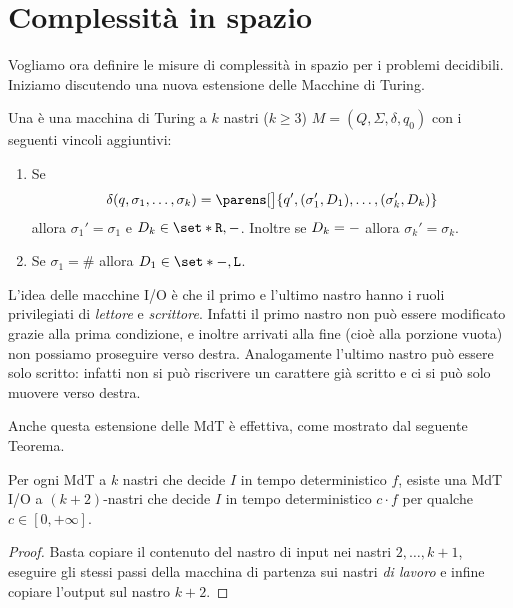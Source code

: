 \section{Complessità in spazio}

Vogliamo ora definire le misure di complessità in spazio per i problemi decidibili.
Iniziamo discutendo una nuova estensione delle Macchine di Turing.

\begin{definition}
    Una  è una macchina di Turing a $k$ nastri ($k \geq 3$)
    $M = (Q, \Sigma, \delta, q_0)$ con i seguenti vincoli aggiuntivi: \begin{enumerate}[(1)]
        \item Se \[
            \delta(q, \sigma_1, \dots, \sigma_k) = 
            \parens[\big]{q', (\sigma_1', D_1), \dots, (\sigma_k', D_k)}
        \] allora $\sigma_1' = \sigma_1$ e $D_k \in \set*{\Right, \blank}$. 
        Inoltre se $D_k = {-}$ allora $\sigma_k' = \sigma_k$.
        \item Se $\sigma_1 = \#$ allora $D_1 \in \set*{\blank, \Left}$.      
    \end{enumerate}
\end{definition}

L'idea delle macchine I/O è che il primo e l'ultimo nastro hanno i ruoli privilegiati di 
\emph{lettore} e \emph{scrittore}. Infatti il primo nastro non può essere modificato 
grazie alla prima condizione, e inoltre arrivati alla fine (cioè alla porzione vuota) non possiamo
proseguire verso destra. Analogamente l'ultimo nastro può essere solo scritto: 
infatti non si può riscrivere un carattere già scritto e ci si può solo muovere verso destra.

Anche questa estensione delle MdT è effettiva, come mostrato dal seguente Teorema.

\begin{theorem}
    Per ogni MdT a $k$ nastri che decide $I$ in tempo deterministico $f$,
    esiste una MdT I/O a $(k+2)$-nastri che decide $I$ in tempo deterministico $c \cdot f$
    per qualche $c \in [0, +\infty]$.        
\end{theorem}
\begin{proof}
    Basta copiare il contenuto del nastro di input nei nastri $2, \dots, k+1$,
    eseguire gli stessi passi della macchina di partenza sui nastri \emph{di lavoro}
    e infine copiare l'output sul nastro $k+2$.  
\end{proof}

